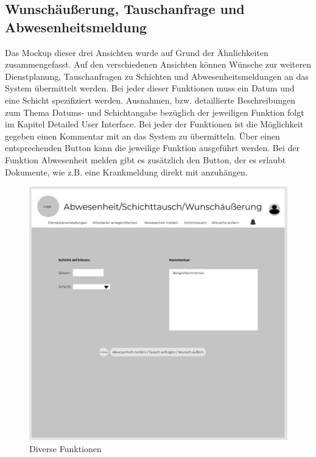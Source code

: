 \documentclass[11pt,
paper=a4,
bibtotocnumbered,	  %
liststotocnumbered,  %
DIV=calc,		  %
tablecaptionabove,	  %
headinclude,
]{article}
\begin{document}
\subsection{Wunschäußerung, Tauschanfrage und Abwesenheitsmeldung}
Das Mockup dieser drei Ansichten wurde auf Grund der Ähnlichkeiten zusammengefasst. Auf den verschiedenen Ansichten können Wünsche zur weiteren Dienstplanung, Tauschanfragen zu Schichten und Abwesenheitsmeldungen an das System übermittelt werden. Bei jeder dieser Funktionen muss ein Datum und eine Schicht spezifiziert werden. Ausnahmen, bzw. detaillierte Beschreibungen zum Thema Datums- und Schichtangabe bezüglich der jeweiligen Funktion folgt im Kapitel Detailed User Interface. Bei jeder der Funktionen ist die Möglichkeit gegeben einen Kommentar mit an das System zu übermitteln. Über einen entsprechenden Button kann die jeweilige Funktion ausgeführt werden. Bei der Funktion Abwesenheit melden gibt es zusätzlich den Button, der es erlaubt Dokumente, wie z.B. eine Krankmeldung direkt mit anzuhängen. 
\begin{figure}[H]
\includegraphics[width=1\textwidth]{Bilder/Abwesenheit_Schichttausch_Wunsch.jpg}
\caption{Diverse Funktionen}
\end{figure}
\end{document}
